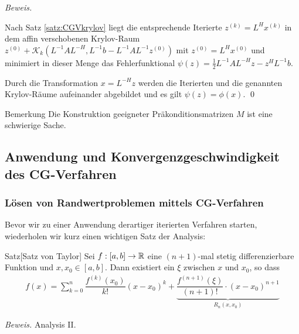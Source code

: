 \textit{Beweis.} %

Nach Satz \ref{satz:CGVkrylov} liegt die entsprechende Iterierte $z^{(k)}=L^Hx^{(k)}$ in dem affin 
verschobenen Krylov-Raum $z^{(0)} + \mathcal{K}_k(L^{-1}AL^{-H}, L^{-1}b-L^{-1}AL^{-1}z^{(0)})$ 
mit $z^{(0)} = L^Hx^{(0)}$ und minimiert in dieser Menge das Fehlerfunktional 
$\psi(z) = \tfrac{1}{2}L^{-1}AL^{-H}z-z^HL^{-1}b$. 

Durch die Transformation $x=L^{-H}z$ werden die Iterierten und die genannten Krylov-Räume aufeinander abgebildet
und es gilt $\psi(z) = \phi(x)$. \qed

\begin{colbox}{Bemerkung}
  Die Konstruktion geeigneter Präkonditionsmatrizen $M$ ist eine schwierige Sache.
\end{colbox}

\subsection{Anwendung und Konvergenzgeschwindigkeit des CG-Verfahren}
\subsubsection{Lösen von Randwertproblemen mittels CG-Verfahren}
Bevor wir zu einer Anwendung derartiger iterierten Verfahren starten, 
wiederholen wir kurz einen wichtigen Satz der Analysis:
\begin{colbox}{Satz}[Satz von Taylor]
  Sei $f:[a,b]\rightarrow \mathbb R$ eine $(n+1)$-mal stetig differenzierbare Funktion und $x,x_0\in[a,b]$. 
  Dann existiert ein $\xi$ zwischen $x$ und $x_0$, so dass
  \begin{align*}f(x) = \sum_{k=0}^{n}\dfrac{f^{(k)}(x_0)}{k!}(x-x_0)^k + 
  \underbrace{\dfrac{f^{(n+1)}(\xi)}{(n+1)!}\cdot(x-x_0)^{n+1}}_{R_n(x,x_0)}\end{align*}
\end{colbox}
\textit{Beweis.} Analysis II.

